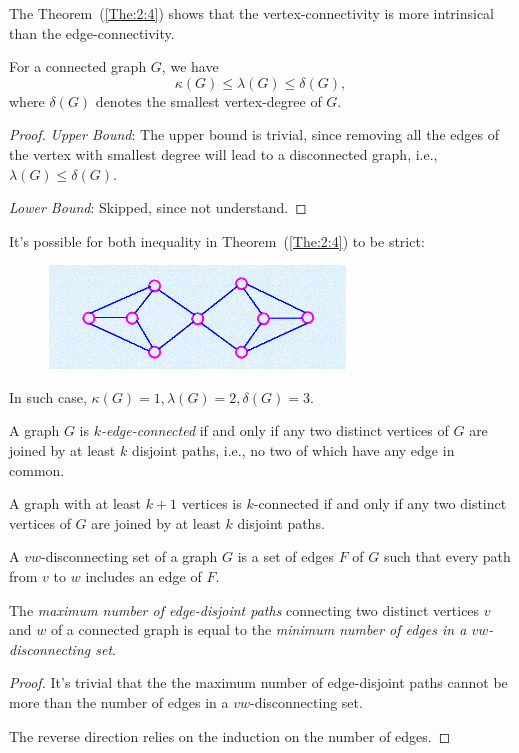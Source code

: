 The Theorem~(\ref{The:2:4}) shows that the vertex-connectivity is more intrinsical than the edge-connectivity.
\begin{theorem}\label{The:2:4}
For a connected graph $G$, we have
\[
\kappa(G)\le\lambda(G)\le\delta(G),
\]
where $\delta(G)$ denotes the smallest vertex-degree of $G$.
\end{theorem}
\begin{proof}
\textit{Upper Bound}:
The upper bound is trivial, since removing all the edges of the vertex with smallest degree will lead to a disconnected graph, i.e., $\lambda(G)\le\delta(G)$.

\textit{Lower Bound}: Skipped, since not understand.
\end{proof}

\begin{example}
It's possible for both inequality in Theorem~(\ref{The:2:4}) to be strict:
\begin{figure}[H]
\centering
\includegraphics[width=0.7\textwidth]{Second_lecture/p_10}
\end{figure}
In such case, $\kappa(G)=1,\lambda(G) = 2,\delta(G)=3$.
\end{example}

\begin{theorem}
A graph $G$ is \emph{$k$-edge-connected} if and only if any two distinct vertices of $G$ are joined  by at least $k$ disjoint paths, i.e., no two of which have any edge in common.
\end{theorem}
\begin{theorem}
A graph with at least $k+1$ vertices is $k$-connected if and only if any two distinct vertices of $G$ are joined by at least $k$ disjoint paths.
\end{theorem}

\begin{definition}
A $vw$-disconnecting set of a graph $G$ is a set of edges $F$ of $G$ such that
every path from $v$ to $w$ includes an edge of $F$.
\end{definition}
\begin{theorem}
The \emph{maximum number of edge-disjoint paths} connecting two distinct vertices $v$ and $w$ of a connected graph is equal to the \emph{minimum number of edges in a $vw$-disconnecting set}.
\end{theorem}
\begin{proof}
It's trivial that the the maximum number of edge-disjoint paths cannot be more than the number of edges in a $vw$-disconnecting set.

The reverse direction relies on the induction on the number of edges.
\end{proof}
